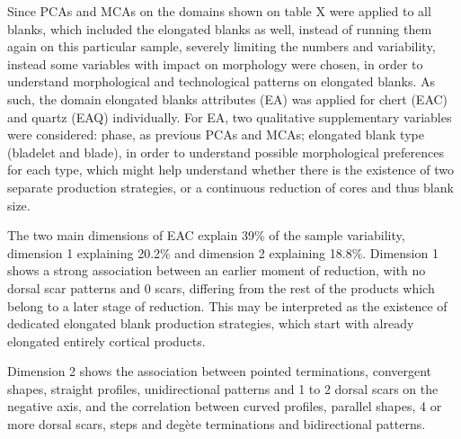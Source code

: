 \documentclass[12pt,twoside]{reedthesis}
\begin{document}
Since PCAs and MCAs on the domains shown on table X were applied to all blanks, which included the elongated blanks as well, instead of running them again on this particular sample, severely limiting the numbers and variability, instead some variables with impact on morphology were chosen, in order to understand morphological and technological patterns on elongated blanks. As such, the domain elongated blanks attributes (EA) was applied for chert (EAC) and quartz (EAQ) individually. For EA, two qualitative supplementary variables were considered: phase, as previous PCAs and MCAs; elongated blank type (bladelet and blade), in order to understand possible morphological preferences for each type, which might help understand whether there is the existence of two separate production strategies, or a continuous reduction of cores and thus blank size.

The two main dimensions of EAC explain 39\% of the sample variability, dimension 1 explaining 20.2\% and dimension 2 explaining 18.8\%.
Dimension 1 shows a strong association between an earlier moment of reduction, with no dorsal scar patterns and 0 scars, differing from the rest of the products which belong to a later stage of reduction. This may be interpreted as the existence of dedicated elongated blank production strategies, which start with already elongated entirely cortical products.

Dimension 2 shows the association between pointed terminations, convergent shapes, straight profiles, unidirectional patterns and 1 to 2 dorsal scars on the negative axis, and the correlation between curved profiles, parallel shapes, 4 or more dorsal scars, steps and degète terminations and bidirectional patterns.
\end{document}
